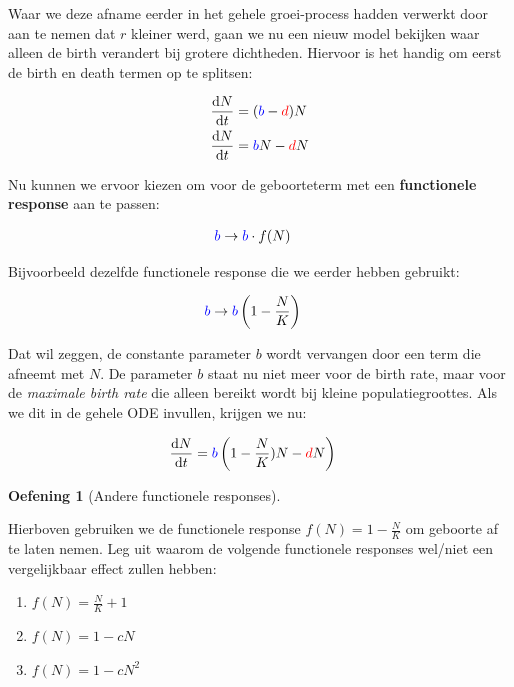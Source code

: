 \documentclass[
  a4paper,
]{scrbook}
\providecommand{\tightlist}{%
  \setlength{\itemsep}{0pt}\setlength{\parskip}{0pt}}\usepackage{longtable,booktabs,array}
\theoremstyle{definition}
\newtheorem{exercise}{Oefening}[chapter]
\theoremstyle{remark}
\begin{document}
Waar we deze afname eerder in het gehele groei-process hadden verwerkt
door aan te nemen dat \(r\) kleiner werd, gaan we nu een nieuw model
bekijken waar alleen de birth verandert bij grotere dichtheden. Hiervoor
is het handig om eerst de birth en death termen op te splitsen:

\begin{align}
    \frac{\mathrm{d}N}{\mathrm{d}t} &= ({\color{blue}b}-{\color{red}d})N\\
    \frac{\mathrm{d}N}{\mathrm{d}t} &= {\color{blue}b}N - {\color{red}d}N
\end{align}

Nu kunnen we ervoor kiezen om voor de geboorteterm met een
\textbf{functionele response} aan te passen:

\begin{align}
    {\color{blue}b} & \rightarrow {\color{blue}b} \cdot f(N)
\end{align}

Bijvoorbeeld dezelfde functionele response die we eerder hebben
gebruikt:

\begin{align}
    {\color{blue}b} & \rightarrow {\color{blue}b} \left( 1-\frac{N}{K} \right)
\end{align}

Dat wil zeggen, de constante parameter \(b\) wordt vervangen door een
term die afneemt met \(N\). De parameter \(b\) staat nu niet meer voor
de birth rate, maar voor de \emph{maximale birth rate} die alleen
bereikt wordt bij kleine populatiegroottes. Als we dit in de gehele ODE
invullen, krijgen we nu:

\begin{align}
    \frac{\mathrm{d}N}{\mathrm{d}t} &= {\color{blue}b} \left(1-\frac{N}{K})N - {\color{red}d}N \right)
\end{align}

\begin{exercise}[Andere functionele
responses]\protect\hypertarget{exr-functioneleresponses}{}\label{exr-functioneleresponses}

Hierboven gebruiken we de functionele response \(f(N)=1-\frac{N}{K}\) om
geboorte af te laten nemen. Leg uit waarom de volgende functionele
responses wel/niet een vergelijkbaar effect zullen hebben:

\begin{enumerate}
\def\labelenumi{\alph{enumi}.}
\tightlist
\item
  \(f(N)=\frac{N}{K} + 1\)
\item
  \(f(N)= 1 - cN\)
\item
  \(f(N)= 1 - cN^2\)
\end{enumerate}

\end{exercise}
\end{document}
